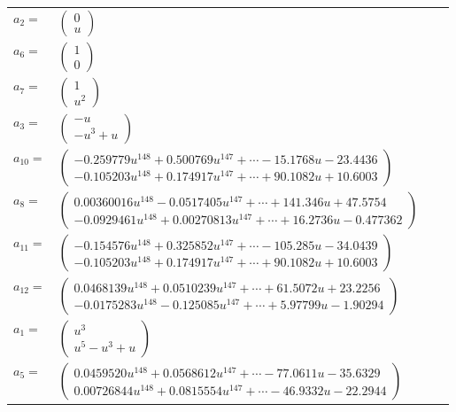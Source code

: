 \documentclass[1p]{elsarticle_modified}
\theoremstyle{definition}
\begin{document}
\begin{tabular}{m{7pt} m{180pt} m{7pt} m{180pt} }
\flushright $a_{2}=$&$\begin{pmatrix}0\\u\end{pmatrix}$ \\
\flushright $a_{6}=$&$\begin{pmatrix}1\\0\end{pmatrix}$ \\
\flushright $a_{7}=$&$\begin{pmatrix}1\\u^2\end{pmatrix}$ \\
\flushright $a_{3}=$&$\begin{pmatrix}- u\\- u^3+u\end{pmatrix}$ \\
\flushright $a_{10}=$&$\begin{pmatrix}-0.259779 u^{148}+0.500769 u^{147}+\cdots-15.1768 u-23.4436\\-0.105203 u^{148}+0.174917 u^{147}+\cdots+90.1082 u+10.6003\end{pmatrix}$ \\
\flushright $a_{8}=$&$\begin{pmatrix}0.00360016 u^{148}-0.0517405 u^{147}+\cdots+141.346 u+47.5754\\-0.0929461 u^{148}+0.00270813 u^{147}+\cdots+16.2736 u-0.477362\end{pmatrix}$ \\
\flushright $a_{11}=$&$\begin{pmatrix}-0.154576 u^{148}+0.325852 u^{147}+\cdots-105.285 u-34.0439\\-0.105203 u^{148}+0.174917 u^{147}+\cdots+90.1082 u+10.6003\end{pmatrix}$ \\
\flushright $a_{12}=$&$\begin{pmatrix}0.0468139 u^{148}+0.0510239 u^{147}+\cdots+61.5072 u+23.2256\\-0.0175283 u^{148}-0.125085 u^{147}+\cdots+5.97799 u-1.90294\end{pmatrix}$ \\
\flushright $a_{1}=$&$\begin{pmatrix}u^3\\u^5- u^3+u\end{pmatrix}$ \\
\flushright $a_{5}=$&$\begin{pmatrix}0.0459520 u^{148}+0.0568612 u^{147}+\cdots-77.0611 u-35.6329\\0.00726844 u^{148}+0.0815554 u^{147}+\cdots-46.9332 u-22.2944\end{pmatrix}$ \\

\end{tabular}
\end{document}
